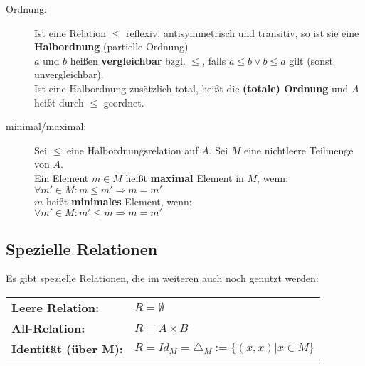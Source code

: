 \begin{description}

  \item [Ordnung:] 
    Ist eine Relation $\leq$ reflexiv, antisymmetrisch und 
    transitiv, so ist sie eine \textbf{Halbordnung} (partielle Ordnung)\\
    $a$ und $b$ heißen \textbf{vergleichbar} bzgl. $\leq$, falls 
    $a \leq b \vee b \leq a$ gilt (sonst unvergleichbar).\\
    Ist eine Halbordnung zusätzlich total, heißt die \textbf{(totale) Ordnung} 
    und $A$ heißt durch $\leq$ geordnet.

  \item [minimal/maximal:]
    Sei $\leq$ eine Halbordnungsrelation auf $A$. Sei $M$ eine nichtleere 
    Teilmenge von $A$.\\
    Ein Element $m \in M$ heißt \textbf{maximal} Element in $M$, wenn:\\
    $\forall m' \in M : m \leq m' \Rightarrow m = m'$\\
    $m$ heißt \textbf{minimales} Element, wenn:\\
    $\forall m' \in M : m' \leq m \Rightarrow m = m'$
\end{description}

\subsection*{Spezielle Relationen}
Es gibt spezielle Relationen, die im weiteren auch noch genutzt werden:\\
\begin{tabular} {l l}
  \textbf{Leere Relation:} & $R = \emptyset$\\
  \textbf{All-Relation:} &  $R = A \times B$\\
  \textbf{Identität (über M):} & $R = Id_M = \triangle_M := \{(x,x) | x \in M\}$
\end{tabular}


